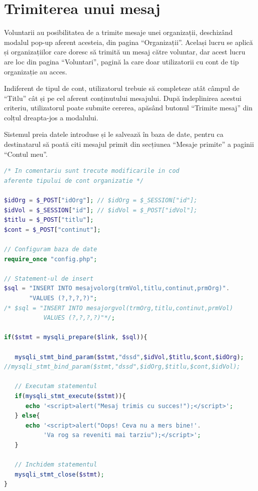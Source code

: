 \documentclass[12pt,a4paper]{report}
\begin{document}
\section{Trimiterea unui mesaj}
\par
Voluntarii au posibilitatea de a trimite mesaje unei organizații, deschizând modalul pop-up aferent acesteia, din pagina “Organizații”. Același lucru se aplică și organizațiilor care doresc să trimită un mesaj către voluntar, dar acest lucru are loc din pagina “Voluntari”, pagină la care doar utilizatorii cu cont de tip organizație au acces.
\\
\par
Indiferent de tipul de cont, utilizatorul trebuie să completeze atât câmpul de “Titlu” cât și pe cel aferent conținutului mesajului. După îndeplinirea acestui criteriu, utilizatorul poate submite cererea, apăsând butonul “Trimite mesaj” din colțul dreapta-jos a modalului.
\\
\par
Sistemul preia datele introduse și le salvează în baza de date, pentru ca destinatarul să poată citi mesajul primit din secțiunea  “Mesaje primite” a paginii  “Contul meu”.
\\

\begin{lstlisting}[basicstyle=\small, language=PHP, caption=Secvența de cod PHP responsabilă cu trimiterea unui mesaj]
/* In comentariu sunt trecute modificarile in cod 
aferente tipului de cont organizatie */

$idOrg = $_POST["idOrg"]; // $idOrg = $_SESSION["id"];
$idVol = $_SESSION["id"]; // $idVol = $_POST["idVol"];
$titlu = $_POST["titlu"];
$cont = $_POST["continut"];

// Configuram baza de date
require_once "config.php";

// Statement-ul de insert
$sql = "INSERT INTO mesajvolorg(trmVol,titlu,continut,prmOrg)".
       "VALUES (?,?,?,?)";
/* $sql = "INSERT INTO mesajorgvol(trmOrg,titlu,continut,prmVol) 
           VALUES (?,?,?,?)"*/;

if($stmt = mysqli_prepare($link, $sql)){

   mysqli_stmt_bind_param($stmt,"dssd",$idVol,$titlu,$cont,$idOrg);
//mysqli_stmt_bind_param($stmt,"dssd",$idOrg,$titlu,$cont,$idVol);

   // Executam statementul
   if(mysqli_stmt_execute($stmt)){
      echo '<script>alert("Mesaj trimis cu succes!");</script>';
   } else{
      echo '<script>alert("Oops! Ceva nu a mers bine!'.
           'Va rog sa reveniti mai tarziu");</script>';
   }

   // Inchidem statementul
   mysqli_stmt_close($stmt);
}
\end{lstlisting}
\end{document}
